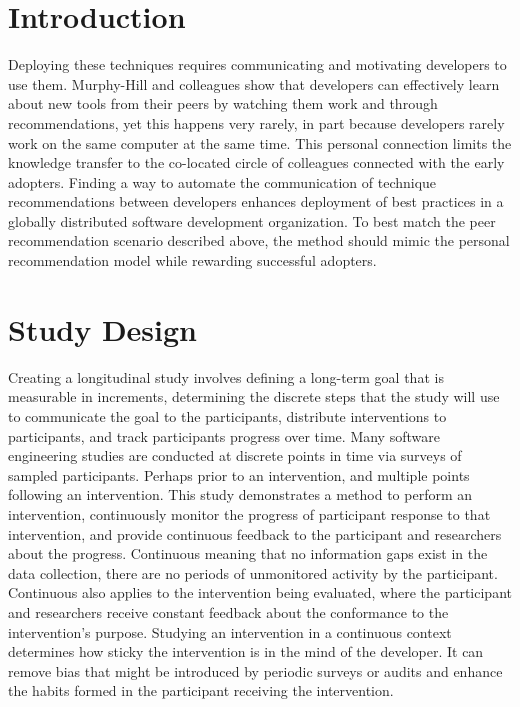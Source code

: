 \documentclass{sig-alternate}
\begin{document}


\section{Introduction}
Deploying these techniques requires communicating and motivating developers to use them.  Murphy-Hill and colleagues  \cite{wbsnipes:Hill2011Peer} show that developers can effectively learn about new tools from their peers by watching them work and through recommendations, yet this happens very rarely, in part because developers rarely work on the same computer at the same time.  This personal connection limits the knowledge transfer to the co-located circle of colleagues connected with the early adopters.  
Finding a way to automate the communication of technique recommendations between developers enhances deployment of best practices in a globally distributed software development organization.   
To best match the peer recommendation scenario described above, the method should mimic the personal recommendation model while rewarding successful adopters.

\section{Study Design}
Creating a longitudinal study involves defining a long-term goal that is measurable in increments, determining the discrete steps that the study will use to communicate the goal to the participants, distribute interventions to participants, and track participants progress over time.  Many software engineering studies are conducted at discrete points in time via surveys of sampled participants.  Perhaps prior to an intervention, and multiple points following an intervention.  This study demonstrates a method to perform an intervention, continuously monitor the progress of participant response to that intervention, and provide continuous feedback to the participant and researchers about the progress.  Continuous meaning that no information gaps exist in the data collection, there are no periods of unmonitored activity by the participant.  Continuous also applies to the intervention being evaluated, where the participant and researchers receive constant feedback about the conformance to the intervention's purpose.  Studying an intervention in a continuous context determines how sticky the intervention is in the mind of the developer.  It can remove bias that might be introduced by periodic surveys or audits and enhance the habits formed in the participant receiving the intervention.
\end{document}
